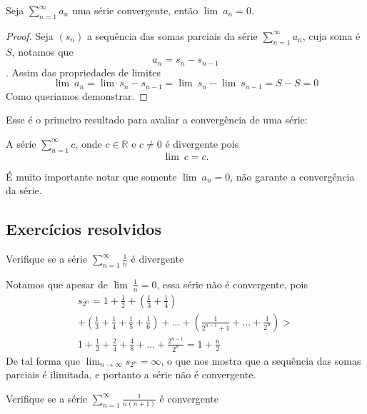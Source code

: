 \begin{teo}
    Seja $\sum_{n = 1}^{\infty} a_n$ uma série convergente, então $\lim{\:} a_n = 0$.
\end{teo}

\begin{proof}
    Seja $(s_n)$ a sequência das somas parciais da série $\sum_{n = 1}^{\infty} a_n$, cuja soma é $S$, notamos que
    $$a_n = s_n - s_{n-1}$$.
    Assim das propriedades de limites
    $$\lim{\:} a_n = \lim {\:}s_n - s_{n-1} = \lim {\:} s_n - \lim {\:}s_{n-1} = S - S = 0$$
    Como queriamos demonstrar.
\end{proof}

Esse é o primeiro resultado para avaliar a convergência de uma série:
\begin{ex}
    A série $\sum_{n = 1}^{\infty} c$, onde $c \in \mathbb{R}$ e $c \neq 0$ é 
    divergente pois
    $$\lim{\:} c = c.$$
\end{ex}

É muito importante notar que somente $\lim{\:} a_n = 0$, não garante a convergência
da série.
\subsection*{Exercícios resolvidos}

\construirExeresol
\begin{exeresol}
    Verifique se a série $\sum_{n = 1}^{\infty} \frac{1}{n}$ é divergente 
\end{exeresol}

\begin{resol}
    Notamos que apesar de $\lim{\:} \frac{1}{n} = 0$, essa série não é convergente,
    pois
\begin{eqnarray}
    s_{2^n} = 1 + \frac{1}{2} + (\frac{1}{3}+\frac{1}{4}) \\
    + (\frac{1}{3}+\frac{1}{4}+\frac{1}{5}+\frac{1}{6})+\dots+(\frac{1}{2^{n-1}+1}+\dots +\frac{1}{2^n}) > \\
    1 + \frac{1}{2}+\frac{2}{4}+ \frac{4}{8}+ \dots +\frac{2^{n-1}}{2^n} = 1 + \frac{n}{2}
\end{eqnarray}   
    De tal forma que $\lim_{n \to \infty} s_{2^n} = \infty$, o que nos mostra que
    a sequência das somas parciais é ilimitada, e portanto a série não é
    convergente.
 \end{resol}

\begin{exeresol}
    Verifique se a série $\sum_{n = 1}^{\infty} \frac{1}{n(n+1)}$ é convergente 
\end{exeresol}

